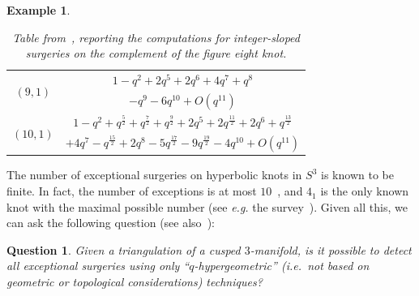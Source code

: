 \documentclass[11pt]{amsart}
\newtheorem{example}[thm]{Example}
\newtheorem{ques}[thm]{Question}
\begin{document}
\begin{example}
\begin{table}
\begin{tabular}{|c|c|}
\hline
\multirow{2}{*}{$\left(9,1\right)$} & $1 - q^2 + 2 q^5 + 2 q^6 + 4 q^7 + q^8$ \\
  & $- q^9 - 6 q^{10} + O\left(q^{11}\right)$ \\
\hline
\multirow{2}{*}{$\left(10,1\right)$} & $1 - q^2 + q^\frac52 + q^\frac72 + q^\frac92 + 2 q^5 + 2 q^\frac{11}2 + 2 q^6 + q^\frac{13}2 $ \\
  & $+ 4 q^7- q^\frac{15}2 + 2 q^8 - 5 q^\frac{17}2 - 9 q^\frac{19}2 - 4 q^{10} + O\left(q^{11}\right)$ \\
\hline
\end{tabular}
\caption{Table from~\cite{3dindexdehn}, reporting the computations for integer-sloped surgeries on the complement of the figure eight knot.}
\label{tab:n1_fig8}
\end{table}
\end{example}



The number of exceptional surgeries on hyperbolic knots in $S^3$ is known to be finite. In fact, the number of exceptions is at most $10$~\cite{lackenby2013maximal}, and $4_1$ is the only known
knot with the maximal possible number (see \textit{e.g.} the survey~\cite{gordon2012exceptional}). Given all this, we can ask the following question (see also~\cite[Sec.~15]{3dindexdehn}):
\begin{ques}
Given a triangulation of a cusped $3$-manifold, is it possible to detect all exceptional surgeries using only ``$q$-hypergeometric'' (\textit{i.e.}~not based on geometric or topological considerations) techniques?
\end{ques}
\end{document}
